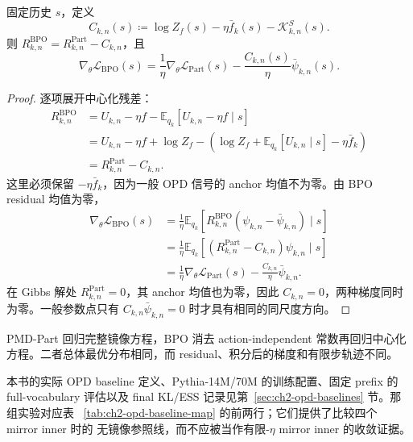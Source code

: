 \documentclass[lang=cn,scheme=chinese,openany]{../book/elegantbook}
\begin{document}
\begin{proposition}
\label{prop:ch2-bpo-part-gradient-gap}
固定历史 $s$，定义
\begin{equation}
C_{k,n}(s)\coloneqq\log Z_f(s)-\eta\bar f_k(s)-\mathcal K_{k,n}^{S}(s).
\label{eq:ch2-bpo-part-qc}
\end{equation}
则 $R_{k,n}^{\mathrm{BPO}}=R_{k,n}^{\mathrm{Part}}-C_{k,n}$，且
\begin{equation}
\nabla_\theta\mathcal L_{\mathrm{BPO}}(s)
=\frac1\eta\nabla_\theta\mathcal L_{\mathrm{Part}}(s)
-\frac{C_{k,n}(s)}\eta\bar\psi_{k,n}(s).
\label{eq:ch2-bpo-part-gradient-gap}
\end{equation}
\end{proposition}
\begin{proof}
逐项展开中心化残差：
\begin{align*}
R_{k,n}^{\mathrm{BPO}}
&=U_{k,n}-\eta f-\mathbb E_{ q_k}[U_{k,n}-\eta f\mid s]\\
&=U_{k,n}-\eta f+\log Z_f
-\left(\log Z_f+\mathbb E_{ q_k}[U_{k,n}\mid s]-\eta\bar f_k\right)\\
&=R_{k,n}^{\mathrm{Part}}-C_{k,n}.
\end{align*}
这里必须保留 $-\eta\bar f_k$，因为一般 OPD 信号的 anchor 均值不为零。由 BPO residual 均值为零，
\begin{align*}
\nabla_\theta\mathcal L_{\mathrm{BPO}}(s)
&=\frac1\eta\mathbb E_{ q_k}[R_{k,n}^{\mathrm{BPO}}(\psi_{k,n}-\bar\psi_{k,n})\mid s]\\
&=\frac1\eta\mathbb E_{ q_k}[(R_{k,n}^{\mathrm{Part}}-C_{k,n})\psi_{k,n}\mid s]\\
&=\frac1\eta\nabla_\theta\mathcal L_{\mathrm{Part}}(s)-\frac{C_{k,n}}\eta\bar\psi_{k,n}.
\end{align*}
在 Gibbs 解处 $R_{k,n}^{\mathrm{Part}}=0$，其 anchor 均值也为零，因此 $C_{k,n}=0$，两种梯度同时为零。一般参数点只有 $C_{k,n}\bar\psi_{k,n}=0$ 时才具有相同的同尺度方向。
\end{proof}

PMD-Part 回归完整镜像方程，BPO 消去 action-independent 常数再回归中心化方程。二者总体最优分布相同，而 residual、积分后的梯度和有限步轨迹不同。

本书的实际 OPD baseline 定义、Pythia-14M/70M 的训练配置、固定 prefix 的 full-vocabulary
评估以及 final KL/ESS 记录见第~\ref{sec:ch2-opd-baselines} 节。那组实验对应表
~\ref{tab:ch2-opd-baseline-map} 的前两行；它们提供了比较四个 mirror inner 时的
无镜像参照线，而不应被当作有限-$\eta$ mirror inner 的收敛证据。
\end{document}
